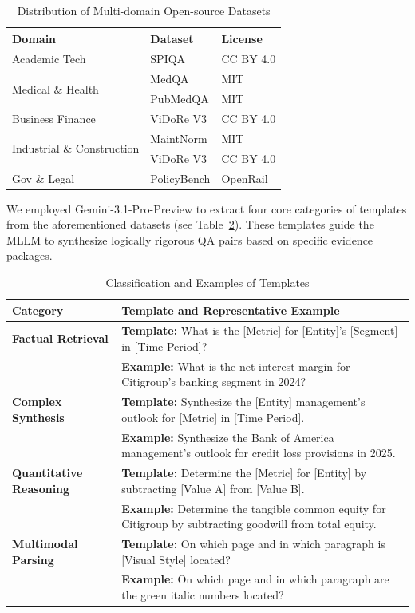 \documentclass[]{opendatalab}
\begin{document}
{{{\begin{table}[htbp]
\centering
\small
\caption{Distribution of Multi-domain Open-source Datasets}
\label{tab:domain_datasets}
\begin{tabular}{lll}
\toprule
\textbf{Domain} & \textbf{Dataset} & \textbf{License} \\
\midrule
Academic Tech & SPIQA \citep{pramanick2024spiqa} & CC BY 4.0 \\
\multirow{2}{*}{Medical \& Health} & MedQA \citep{jin2020disease} & MIT \\
 & PubMedQA \citep{jin2019pubmedqa} & MIT \\
Business Finance & ViDoRe V3 \citep{loison2026vidore} & CC BY 4.0 \\
\multirow{2}{*}{Industrial \& Construction} & MaintNorm \citep{bikaun2024maintnorm} & MIT \\
 & ViDoRe V3 \citep{loison2026vidore} & CC BY 4.0 \\
Gov \& Legal & PolicyBench \citep{foo2025know} & OpenRail \\
\bottomrule
\end{tabular}
\end{table}

We employed Gemini-3.1-Pro-Preview to extract four core categories of templates from the aforementioned datasets (see Table~\ref{tab:template_examples}). These templates guide the MLLM to synthesize logically rigorous QA pairs based on specific evidence packages.

\begin{table}[htbp]
\centering
\small
\caption{Classification and Examples of Templates}
\label{tab:template_examples}
\begin{tabularx}{\textwidth}{l|X}
\toprule
\textbf{Category} & \textbf{Template and Representative Example} \\
\midrule
\textbf{Factual Retrieval} & \textbf{Template:} What is the [Metric] for [Entity]'s [Segment] in [Time Period]? \\
 & \textbf{Example:} What is the net interest margin for Citigroup's banking segment in 2024? \\
\midrule
\textbf{Complex Synthesis} & \textbf{Template:} Synthesize the [Entity] management's outlook for [Metric] in [Time Period]. \\
 & \textbf{Example:} Synthesize the Bank of America management's outlook for credit loss provisions in 2025. \\
\midrule
\textbf{Quantitative Reasoning} & \textbf{Template:} Determine the [Metric] for [Entity] by subtracting [Value A] from [Value B]. \\
 & \textbf{Example:} Determine the tangible common equity for Citigroup by subtracting goodwill from total equity. \\
\midrule
\textbf{Multimodal Parsing} & \textbf{Template:} On which page and in which paragraph is [Visual Style] located? \\
 & \textbf{Example:} On which page and in which paragraph are the green italic numbers located? \\
\bottomrule
\end{tabularx}
\end{table}

}}}
\end{document}
